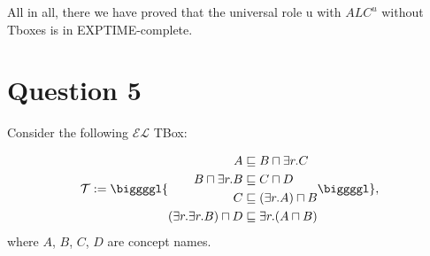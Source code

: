 \documentclass{article}
\begin{document}
    All in all, there we have proved that the universal role u with $ALC^u$ without Tboxes is in EXPTIME-complete.\\
    
    \section{Question 5}
    Consider the following $\mathcal{EL}$ TBox:

    \begin{equation*}
      \mathcal{T}:=\biggggl\{
      \begin{aligned}
      A&\sqsubseteq B\sqcap\exists r.C\\
      B\sqcap\exists r.B&\sqsubseteq C\sqcap D\\
      C&\sqsubseteq(\exists r.A)\sqcap B\\
      (\exists r.\exists r.B)\sqcap D&\sqsubseteq\exists r.(A\sqcap B)
      \end{aligned}
      \biggggl\},
    \end{equation*}where $A$, $B$, $C$, $D$ are concept names. 
    
\end{document}
